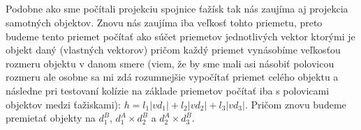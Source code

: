 \documentclass[a4paper]{article}
\begin{document}
	\subsection{}
	Podobne ako sme počítali projekciu spojnice ťažísk tak nás zaujíma aj projekcia samotných objektov. Znovu nás zaujíma iba veľkosť tohto priemetu, preto budeme tento priemet počítať ako súčet priemetov jednotlivých vektor ktorými je objekt daný (vlastných vektorov) pričom každý priemet vynásobíme veľkosťou rozmeru objektu v danom smere (viem, že by sme mali asi násobiť polovicou rozmeru ale osobne sa mi zdá rozumnejšie vypočítať priemet celého objektu a následne pri testovaní kolízie na základe priemetov počítať iba s polovicami objektov medzi ťažiskami): $h=l_1|vd_1| +l_2|vd_2|+l_3|vd_3|$. Pričom znovu budeme premietať objekty na $d_1^B$, $d_1^A \times d_2^B$ a $d_2^A \times d_3^B$.
	
\end{document}
